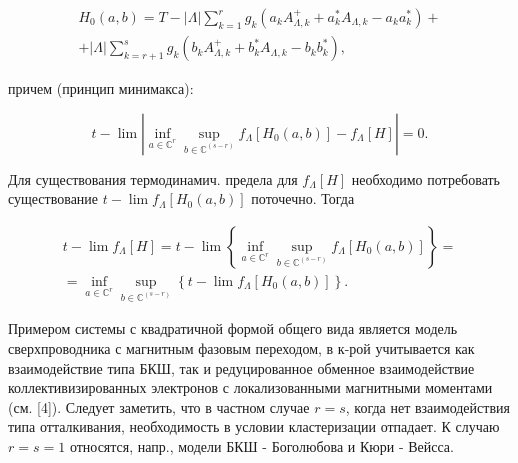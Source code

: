 \documentclass[10pt]{article}
\begin{document}
\[

\begin{gathered}

H_{0}(a, b)=T-|\Lambda| \sum_{k=1}^{r} g_{k}\left(a_{k} A_{\Lambda, k}^{+}+a_{k}^{*} A_{\Lambda, k}-a_{k} a_{k}^{*}\right)+ \\

+|\Lambda| \sum_{k=r+1}^{s} g_{k}\left(b_{k} A_{\Lambda, k}^{+}+b_{k}^{*} A_{\Lambda, k}-b_{k} b_{k}^{*}\right),

\end{gathered}

\]



причем (принцип минимакса):



\[

t-\lim \left|\inf _{a \in \mathbb{C}^{r}} \sup _{b \in \mathbb{C}^{(s-r)}} f_{\Lambda}\left[H_{0}(a, b)\right]-f_{\Lambda}[H]\right|=0 .

\]



Для существования термодинамич. предела для $f_{\Lambda}[H]$ необходимо потребовать существование $t-\lim f_{\Lambda}\left[H_{0}(a, b)\right]$ поточечно. Тогда



\[

\begin{gathered}

t-\lim f_{\Lambda}[H]=t-\lim \left\{\inf _{a \in \mathbb{C}^{r}} \sup _{b \in \mathbb{C}^{(s-r)}} f_{\Lambda}\left[H_{0}(a, b)\right]\right\}= \\

=\inf _{a \in \mathbb{C}^{r}} \sup _{b \in \mathbb{C}^{(s-r)}}\left\{t-\lim f_{\Lambda}\left[H_{0}(a, b)\right]\right\} .

\end{gathered}

\]



Примером системы с квадратичной формой общего вида является модель сверхпроводника с магнитным фазовым переходом, в к-рой учитывается как взаимодействие типа БКШ, так и редуцированное обменное взаимодействие коллективизированных электронов с локализованными магнитными моментами (см. [4]). Следует заметить, что в частном случае $r=s$, когда нет взаимодействия типа отталкивания, необходимость в условии кластеризации отпадает. К случаю $r=s=1$ относятся, напр., модели БКШ - Боголюбова и Кюри - Вейсса.
\end{document}
